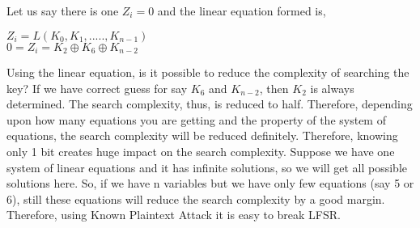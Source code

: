 \documentclass[11pt]{article}
\begin{document}
\newline
Let us say there is one $Z_i = 0$ and the linear equation formed is,
\begin{center}
    $Z_i = L(K_0, K_1,....., K_{n-1})$\\
    $0 = Z_i = K_2 \oplus K_6 \oplus K_{n-2}$\\
\end{center}
Using the linear equation, is it possible to reduce the complexity of searching the key? If we have correct guess for say $K_6$ and $K_{n-2}$, then $K_2$ is always determined. The search complexity, thus, is reduced to half. Therefore, depending upon how many equations you are getting and the property of the system of equations, the search complexity will be reduced definitely. Therefore, knowing only 1 bit creates huge impact on the search complexity. Suppose we have one system of linear equations and it has infinite solutions, so we will get all possible solutions here. So, if we have n variables but we have only few equations (say 5 or 6), still these equations will reduce the search complexity by a good margin. Therefore, using Known Plaintext Attack it is easy to break LFSR.\\
\end{document}
